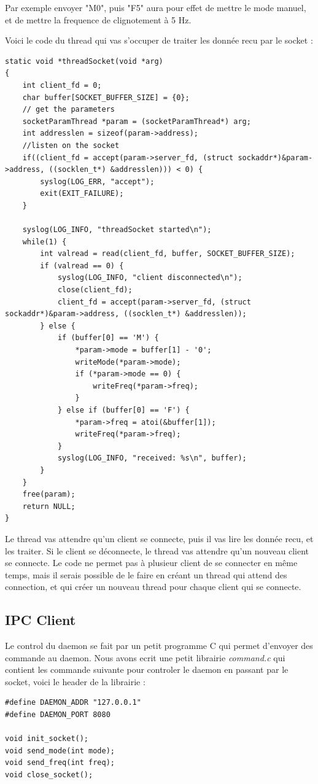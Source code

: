 \documentclass[
	a4paper, %
	10pt, %
]{CSUniSchoolLabReport}
\begin{document}
Par exemple envoyer "M0", puis "F5" aura pour effet de mettre le mode manuel, et de mettre la frequence de clignotement à 5 Hz.

Voici le code du thread qui vas s'occuper de traiter les donnée recu par le socket : \\
\begin{lstlisting}[style=CStyle]
static void *threadSocket(void *arg)
{
	int client_fd = 0;
	char buffer[SOCKET_BUFFER_SIZE] = {0};
	// get the parameters
	socketParamThread *param = (socketParamThread*) arg;
	int addresslen = sizeof(param->address);
	//listen on the socket
	if((client_fd = accept(param->server_fd, (struct sockaddr*)&param->address, ((socklen_t*) &addresslen))) < 0) {
		syslog(LOG_ERR, "accept");
		exit(EXIT_FAILURE);
	}

	syslog(LOG_INFO, "threadSocket started\n");
	while(1) {
		int valread = read(client_fd, buffer, SOCKET_BUFFER_SIZE);
		if (valread == 0) {
			syslog(LOG_INFO, "client disconnected\n");
			close(client_fd);
			client_fd = accept(param->server_fd, (struct sockaddr*)&param->address, ((socklen_t*) &addresslen));
		} else {
			if (buffer[0] == 'M') {
				*param->mode = buffer[1] - '0';
				writeMode(*param->mode);
				if (*param->mode == 0) {
					writeFreq(*param->freq);
				}
			} else if (buffer[0] == 'F') {
				*param->freq = atoi(&buffer[1]);
				writeFreq(*param->freq);
			}
			syslog(LOG_INFO, "received: %s\n", buffer);
		}
	}
	free(param);
	return NULL;
}
\end{lstlisting}
Le thread vas attendre qu'un client se connecte, puis il vas lire les donnée recu, et les traiter.
Si le client se déconnecte, le thread vas attendre qu'un nouveau client se connecte.
Le code ne permet pas à plusieur client de se connecter en même temps, mais il serais possible de le faire en créant un thread qui attend des connection, et qui créer un nouveau thread pour chaque client qui se connecte. \\

\subsection{IPC Client}\label{IPCClient}
Le control du daemon se fait par un petit programme C qui permet d'envoyer des commande au daemon.
Nous avons ecrit une petit librairie \textit{command.c} qui contient les commande suivante pour controler le daemon en passant par le socket, voici le header de la librairie : \\
\begin{lstlisting}[style=CStyle]
#define DAEMON_ADDR "127.0.0.1"
#define DAEMON_PORT 8080

void init_socket();
void send_mode(int mode);
void send_freq(int freq);
void close_socket();
\end{lstlisting}
\end{document}

